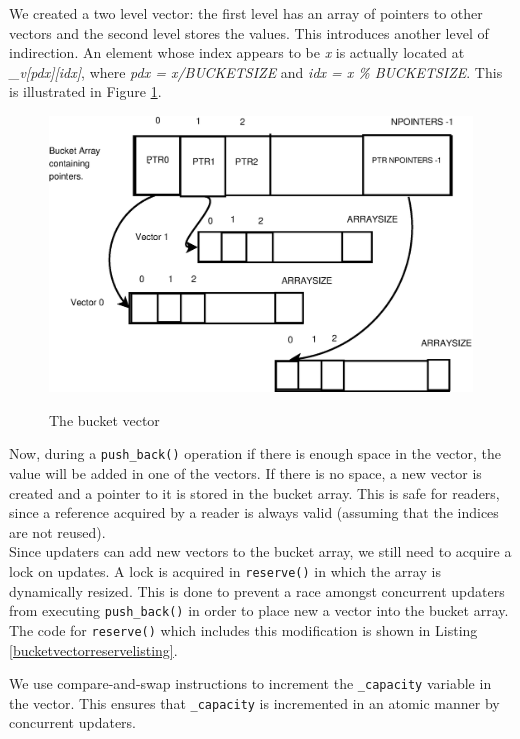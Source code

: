 \documentclass[a4paper,marginparwidth=50pt,marginparsep=10pt]{article}
\begin{document}
We created a two level vector: the first level has an array of pointers to other vectors and the second level stores the values. This introduces another level of indirection. An element whose index appears to be \emph{x} is actually located at \emph{\_v[pdx][idx]}, where \emph{pdx = x/BUCKETSIZE} and \emph{idx = x \% BUCKETSIZE}. This is illustrated in Figure \ref{bucketvector}. 
\begin{figure}[tph]
\includegraphics[scale = 0.4]{../images/diagrams/bucketvector.eps}
\label{bucketvector}
\caption{The bucket vector}
\end{figure}
Now, during a \verb+push_back()+ operation if there is enough space in the vector, the value will be added in one of the vectors. If there is no space, a new vector is created and a pointer to it is stored in the bucket array. This is safe for readers, since a reference acquired by a reader is always valid (assuming that the indices are not reused).\\

Since updaters can add new vectors to the bucket array, we still need to acquire a lock on updates. A lock is acquired in \verb+reserve()+ in which the array is dynamically resized. This is done to prevent a race amongst concurrent updaters from executing \verb+push_back()+ in order to place new a vector into the bucket array. The code for \verb+reserve()+ which includes this modification is shown in Listing \ref{bucketvectorreservelisting}.

We use compare-and-swap instructions to increment the \verb+_capacity+ variable in the vector. This ensures that \verb+_capacity+ is incremented in an atomic manner by concurrent updaters.
\end{document}
